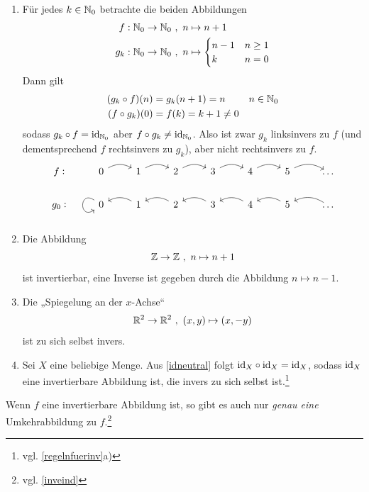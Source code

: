 \begin{bsp} \label{bsp:umkehrabb} \qquad
    \begin{enumerate}
        \item Für jedes $k\in \mathbb N_0$ betrachte die beiden Abbildungen
        \begin{align*}
            f:\mathbb N_0 \to \mathbb N_0 \ &,\ n \mapsto n+1 \\
            g_k: \mathbb N_0 \to \mathbb N_0\ &,\ n \mapsto \begin{cases}
                n-1 & n\ge 1 \\
                k & n=0
            \end{cases}
        \end{align*}
        Dann gilt
        \begin{align*}
            (g_k\circ f)(n)&=g_k(n+1)=n && n\in \mathbb N_0 \\
            (f\circ g_k)(0) & = f(k) = k+1 \neq 0
        \end{align*}
        sodass $g_k\circ f=\mathrm{id}_{\mathbb N_0}$ aber $f\circ g_k\neq \mathrm{id}_{\mathbb N_0}$. Also ist zwar $g_k$ linksinvers zu $f$ (und dementsprechend $f$ rechtsinvers zu $g_k$), aber nicht rechtsinvers zu $f$.
        \[\begin{tikzcd}
            f\vcentcolon & 0 \ar[r, bend left]& 1 \ar[r, bend left]& 2 \ar[r, bend left]& 3 \ar[r, bend left]& 4 \ar[r, bend left]& 5 \ar[r, bend left]& \dots \\
            g_0\vcentcolon & 0 \ar[loop, out=145, in=215, looseness=5] & 1 \ar[l, bend right] & 2 \ar[l, bend right] & 3 \ar[l, bend right] & 4  \ar[l, bend right] & 5  \ar[l, bend right] &  \ar[l, bend right]  \dots
        \end{tikzcd}\]
        \item Die Abbildung
            \[ \mathbb Z\to \mathbb Z \ ,\ n\mapsto n+1 \]
        ist invertierbar, eine Inverse ist gegeben durch die Abbildung $n\mapsto n-1$.
        \item Die „Spiegelung an der $x$-Achse“
        \[ \mathbb R^2 \to \mathbb R^2 \ ,\ (x,y) \mapsto (x,-y) \]
        ist zu sich selbst invers.
        \item Sei $X$ eine beliebige Menge. Aus \cref{idneutral} folgt $\mathrm{id}_X\circ \mathrm{id}_X=\mathrm{id}_X$, sodass $\mathrm{id}_X$ eine invertierbare Abbildung ist, die invers zu sich selbst ist.\footnote{vgl. \cref{regelnfuerinv}a)}
    \end{enumerate}
\end{bsp}


\begin{satz}\label{umkehreind}
    Wenn $f$ eine invertierbare Abbildung ist, so gibt es auch nur \emph{genau eine} Umkehrabbildung zu $f$.\footnote{vgl. \cref{inveind}}
\end{satz}


